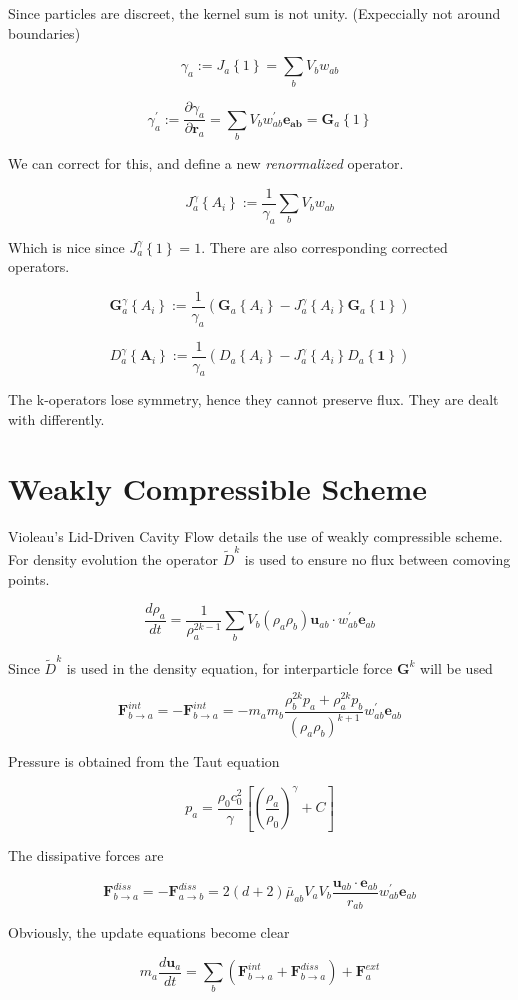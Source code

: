 \documentclass[12pt]{article}
\begin{document}
Since particles are discreet, the kernel sum is not unity.
(Expeccially not around boundaries)

\[
    \gamma_a := J_a \left\{ 1 \right\} = \sum\limits_{b} V_b w_{ab}
\]

\[
    \gamma_a^{'} := \frac{\partial\gamma_a}{\partial\mathbf{r}_a} = 
    \sum\limits_{b} V_b w^{'}_{ab} \mathbf{e_{ab}} =
    \mathbf{G}_a\left\{1\right\}
\]

We can correct for this, and define a new \textit{renormalized} operator.

\[
    J^{\gamma}_a \left\{A_i\right\} := 
    \frac{1}{\gamma_a} \sum\limits_{b} V_b w_{ab}
\]

Which is nice since $J^{\gamma}_a \left\{1\right\}=1$.
There are also corresponding corrected operators.

\[
    \mathbf{G}^\gamma_a \left\{ A_i \right\} := \frac{1}{\gamma_a} \left(
        \mathbf{G}_a \left\{ A_i \right\} -
        J^{\gamma}_a \left\{A_i\right\} \mathbf{G}_a\left\{1\right\} \right)
\]

\[
    D^\gamma_a \left\{ \mathbf{A}_i \right\} := \frac{1}{\gamma_a} \left(
        D_a \left\{ A_i \right\} -
    J^{\gamma}_a \left\{A_i\right\} D_a\left\{\mathbf{1}\right\} \right)
\]

The k-operators lose symmetry, hence they cannot preserve flux.
They are dealt with differently.

\section{Weakly Compressible Scheme}

Violeau's Lid-Driven Cavity Flow details the use of weakly compressible scheme.
For density evolution the operator $\widetilde{D}^k$ is used to ensure no flux
between comoving points.

\[
    \frac{d\rho_a}{dt} = \frac{1}{\rho_a^{2k-1}} \sum\limits_{b}
    V_b {\left(\rho_a\rho_b\right)} \mathbf{u}_{ab} \cdot w^{'}_{ab}
    \mathbf{e}_{ab}
\]

Since $\widetilde{D}^k$ is used in the density equation,
for interparticle force $\mathbf{G}^k$ will be used

\[
    \mathbf{F}^{int}_{b \rightarrow a} = -\mathbf{F}^{int}_{b \rightarrow a} =
    -m_am_b\frac{\rho_b^{2k}p_a+\rho_a^{2k}p_b}{{\left(\rho_a\rho_b\right)}^{k+1}}
    w^{'}_{ab}\mathbf{e}_{ab}
\]

Pressure is obtained from the Taut equation

\[
    p_a = \frac{\rho_0c^2_0}{\gamma} \left[
        {\left( \frac{\rho_a}{\rho_0} \right)}^\gamma + C
    \right]
\]

The dissipative forces are

\[
    \mathbf{F}^{diss}_{b \rightarrow a} = -\mathbf{F}^{diss}_{a \rightarrow b} =
    2 \left( d + 2 \right) \bar{\mu}_{ab} V_a V_b
    \frac{\mathbf{u}_{ab} \cdot \mathbf{e}_{ab} }{r_{ab}}
    w^{'}_{ab}\mathbf{e}_{ab}
\]

Obviously, the update equations become clear

\[
    m_a \frac{d\mathbf{u}_a}{dt} = \sum\limits_b \left(
        \mathbf{F}^{int}_{b \rightarrow a} + \mathbf{F}^{diss}_{b \rightarrow a}
    \right) + \mathbf{F}^{ext}_{a}
\]
\end{document}
